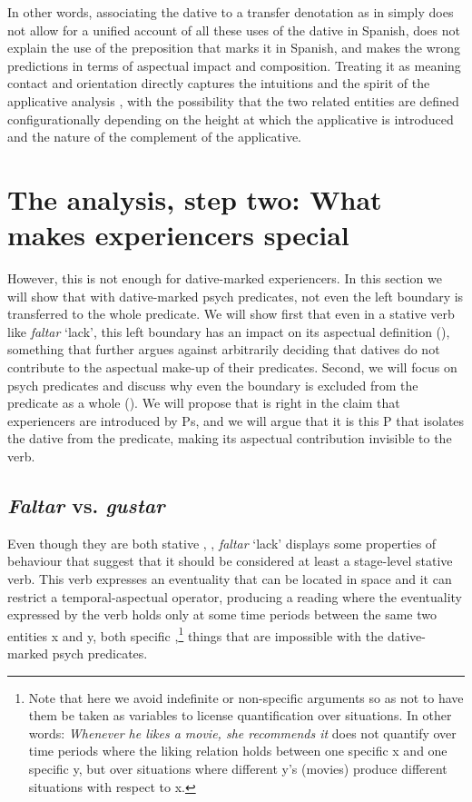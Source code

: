 \documentclass[output=paper,colorlinks,citecolor=brown,nonflat]{langsci/langscibook}
\begin{document}
In other words, associating the dative to a transfer denotation as in  simply does not allow for a unified account of all these uses of the dative in Spanish, does not explain the use of the preposition that marks it in Spanish, and makes the wrong predictions in terms of aspectual impact and composition. Treating it as meaning contact and orientation directly captures the intuitions and the spirit of the applicative analysis \citep{Cuervo2003}, with the possibility that the two related entities are defined configurationally depending on the height at which the applicative is introduced and the nature of the complement of the applicative.

\section{The analysis, step two: What makes experiencers special}\label{sec:fabregas:3}

However, this is not enough for dative-marked experiencers. In this section we will show that with dative-marked psych predicates, not even the left boundary is transferred to the whole predicate. We will show first that even in a stative verb like \textit{faltar} `lack', this left boundary has an impact on its aspectual definition (), something that further argues against arbitrarily deciding that datives do not contribute to the aspectual make-up of their predicates. Second, we will focus on psych predicates and discuss why even the boundary is excluded from the predicate as a whole (). We will propose that \citet{Landau2010} is right in the claim that experiencers are introduced by Ps, and we will argue that it is this P that isolates the dative from the predicate, making its aspectual contribution invisible to the verb.

\subsection{\textit{Faltar} vs. \textit{gustar}}\label{sec:fabregas:3.1}

Even though they are both stative , \citealt{GarcíaFernándezGutiérrezBergarecheMartinez2006}, \textit{faltar} `lack' displays some properties of behaviour that suggest that it should be considered at least a stage-level stative verb. This verb expresses an eventuality that can be located in space  and it can restrict a temporal-aspectual operator, producing a reading where the eventuality expressed by the verb holds only at some time periods between the same two entities x and y, both specific \citep[cf. 27]{Kratzer1995},\footnote{Note that here we avoid indefinite or non-specific arguments so as not to have them be taken as variables to license quantification over situations. In other words: \textit{Whenever he likes a movie, she recommends it} does not quantify over time periods where the liking relation holds between one specific x and one specific y, but over situations where different y's (movies) produce different situations with respect to x.} things that are impossible with the dative-marked psych predicates.
\end{document}
